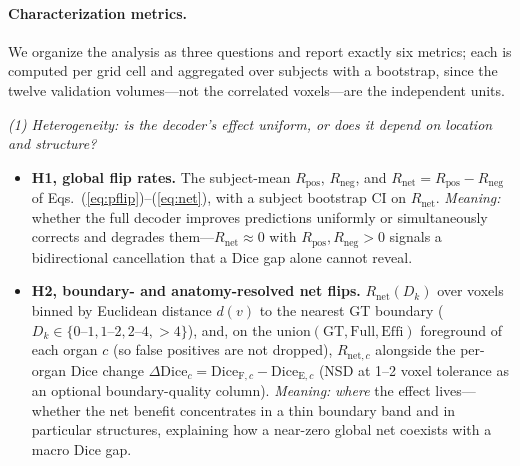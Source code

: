 \paragraph{Characterization metrics.}
We organize the analysis as three questions and report exactly six metrics; each is
computed per grid cell and aggregated over subjects with a bootstrap, since the twelve
validation volumes---not the correlated voxels---are the independent units.

\smallskip\noindent\textit{(1) Heterogeneity: is the decoder's effect uniform, or does
it depend on location and structure?}
\begin{itemize}\setlength\itemsep{1pt}
  \item \textbf{H1, global flip rates.} The subject-mean $R_{\mathrm{pos}}$,
  $R_{\mathrm{neg}}$, and $R_{\mathrm{net}}=R_{\mathrm{pos}}-R_{\mathrm{neg}}$ of
  Eqs.~(\ref{eq:pflip})--(\ref{eq:net}), with a subject bootstrap CI on
  $R_{\mathrm{net}}$. \emph{Meaning:} whether the full decoder improves predictions
  uniformly or simultaneously corrects and degrades them---$R_{\mathrm{net}}\!\approx\!0$
  with $R_{\mathrm{pos}},R_{\mathrm{neg}}\!>\!0$ signals a bidirectional cancellation
  that a Dice gap alone cannot reveal.
  \item \textbf{H2, boundary- and anatomy-resolved net flips.} $R_{\mathrm{net}}(D_k)$
  over voxels binned by Euclidean distance $d(v)$ to the nearest GT boundary
  ($D_k\!\in\!\{0\text{--}1,1\text{--}2,2\text{--}4,{>}4\}$), and, on the
  $\mathrm{union}(\mathrm{GT},\mathrm{Full},\mathrm{Effi})$ foreground of each organ $c$
  (so false positives are not dropped), $R_{\mathrm{net},c}$ alongside the per-organ Dice
  change $\Delta\mathrm{Dice}_c=\mathrm{Dice}_{\mathrm{F},c}-\mathrm{Dice}_{\mathrm{E},c}$
  (NSD at 1--2 voxel tolerance as an optional boundary-quality column). \emph{Meaning:}
  \emph{where} the effect lives---whether the net benefit concentrates in a thin boundary
  band and in particular structures, explaining how a near-zero global net coexists with a
  macro Dice gap.
\end{itemize}

